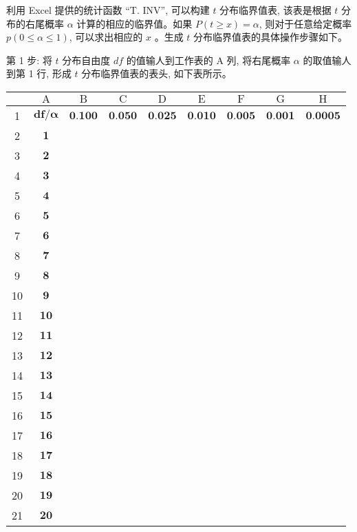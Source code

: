 \documentclass[10pt]{article}
\begin{document}
\begin{CJK*}{UTF8}{bsmi}
利用 Excel 提供的统计函数 “T. INV”, 可以构建 $t$ 分布临界值表, 该表是根据 $t$ 分布的右尾概率 $\alpha$ 计算的相应的临界值。如果 $P(t \geqslant x)=\alpha$, 则对于任意给定概率 $p(0 \leqslant \alpha \leqslant 1)$, 可以求出相应的 $x$ 。生成 $t$ 分布临界值表的具体操作步骤如下。

第 1 步: 将 $t$ 分布自由度 $d f$ 的值输人到工作表的 A 列, 将右尾概率 $\alpha$ 的取值输人到第 1 行, 形成 $t$ 分布临界值表的表头, 如下表所示。

\begin{center}
\begin{tabular}{|c|c|c|c|c|c|c|c|c|}
\hline
 & $\mathrm{A}$ & $\mathrm{B}$ & $\mathrm{C}$ & $\mathrm{D}$ & $\mathrm{E}$ & $\mathrm{F}$ & $\mathrm{G}$ & $\mathrm{H}$ \\
\hline
1 & $\mathbf{d f / \alpha}$ & $\mathbf{0 . 1 0 0}$ & $\mathbf{0 . 0 5 0}$ & $\mathbf{0 . 0 2 5}$ & $\mathbf{0 . 0 1 0}$ & $\mathbf{0 . 0 0 5}$ & $\mathbf{0 . 0 0 1}$ & $\mathbf{0 . 0 0 0 5}$ \\
\hline
2 & $\mathbf{1}$ &  &  &  &  &  &  &  \\
\hline
3 & $\mathbf{2}$ &  &  &  &  &  &  &  \\
\hline
4 & $\mathbf{3}$ &  &  &  &  &  &  &  \\
\hline
5 & $\mathbf{4}$ &  &  &  &  &  &  &  \\
\hline
6 & $\mathbf{5}$ &  &  &  &  &  &  &  \\
\hline
7 & $\mathbf{6}$ &  &  &  &  &  &  &  \\
\hline
8 & $\mathbf{7}$ &  &  &  &  &  &  &  \\
\hline
9 & $\mathbf{8}$ &  &  &  &  &  &  &  \\
\hline
10 & $\mathbf{9}$ &  &  &  &  &  &  &  \\
\hline
11 & $\mathbf{1 0}$ &  &  &  &  &  &  &  \\
\hline
12 & $\mathbf{1 1}$ &  &  &  &  &  &  &  \\
\hline
13 & $\mathbf{1 2}$ &  &  &  &  &  &  &  \\
\hline
14 & $\mathbf{1 3}$ &  &  &  &  &  &  &  \\
\hline
15 & $\mathbf{1 4}$ &  &  &  &  &  &  &  \\
\hline
16 & $\mathbf{1 5}$ &  &  &  &  &  &  &  \\
\hline
17 & $\mathbf{1 6}$ &  &  &  &  &  &  &  \\
\hline
18 & $\mathbf{1 7}$ &  &  &  &  &  &  &  \\
\hline
19 & $\mathbf{1 8}$ &  &  &  &  &  &  &  \\
\hline
20 & $\mathbf{1 9}$ &  &  &  &  &  &  &  \\
\hline
21 & $\mathbf{2 0}$ &  &  &  &  &  &  &  \\
\hline
\end{tabular}
\end{center}


\end{CJK*}
\end{document}
